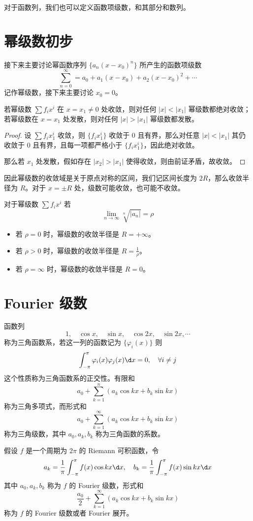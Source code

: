 对于函数列，我们也可以定义函数项级数，和其部分和数列。

\section{幂级数初步}

接下来主要讨论幂函数序列 $\{a_n(x- x_0)^n \}$ 所产生的函数项级数
\[ \sum_{n=0}^{\infty} = a_0 + a_1(x-x_0) + a_2(x-x_0)^2 + \cdots \]
记作幂级数，接下来主要讨论 $x_0 = 0$。

\begin{theorem}
	若幂级数 $\sum f_i x^i$ 在 $x = x_1 \neq 0$ 处收敛，则对任何 $|x| < |x_1|$ 幂级数都绝对收敛；若幂级数在 $x = x_1$ 处发散，则对任何 $|x| > |x_1|$ 幂级数都发散。
\end{theorem}

\begin{proof}
	设 $\sum f_i x_1^i$ 收敛，则 $\{f_i x_1^i\}$ 收敛于 $0$ 且有界，那么对任意 $|x| < |x_1|$ 其仍收敛于 $0$ 且有界，且每一项都严格小于 $\{f_i x_1^i\}$，因此绝对收敛。
	
	那么若 $x_1$ 处发散，假如存在 $|x_2| > |x_1|$ 使得收敛，则由前证矛盾，故收敛。
\end{proof}

因此幂级数的收敛域是关于原点对称的区间，我们记区间长度为 $2R$，那么收敛半径为 $R$。对于 $x = \pm R$ 处，级数可能收敛，也可能不收敛。

\begin{theorem}
	对于幂级数 $\sum f_i x^i$ 若
	\[ \lim_{n \to \infty} \sqrt[n]{|a_n|} = \rho \]
	\begin{itemize}
		\item 若 $\rho = 0$ 时，幂级数的收敛半径是 $R = +\infty$。
		\item 若 $\rho > 0$ 时，幂级数的收敛半径是 $R = \frac{1}{\rho}$。
		\item 若 $\rho = \infty$ 时，幂级数的收敛半径是 $R = 0$。
	\end{itemize}
\end{theorem}

\section{Fourier 级数}

函数列
\[ 1, \quad \cos x, \quad \sin x, \quad \cos 2x, \quad \sin 2x , \cdots \]
称为三角函数系，若这一列的函数记为 $\{\varphi_i(x)\}$ 则
\[ \int_{-\pi}^{\pi} \varphi_i(x) \varphi_j(x) \d x = 0, \quad \forall i \neq j \]
这个性质称为三角函数系的正交性。有限和
\[ a_0 + \sum_{k=1}^n (a_k \cos kx + b_k \sin kx) \]
称为三角多项式，而形式和
\[ a_0 + \sum_{k=1}^\infty (a_k \cos kx + b_k \sin kx) \]
称为三角级数，其中 $a_0, a_k, b_k$ 称为三角函数的系数。

\begin{definition}
	假设 $f$ 是一个周期为 $2\pi$ 的 Riemann 可积函数，令
	\[ a_k = \frac{1}{\pi} \int_{-\pi}^{\pi} f(x) \cos kx \d x, \quad b_k = \frac{1}{\pi} \int_{-\pi}^{\pi} f(x) \sin k x \d x \]
	其中 $a_0, a_k, b_k$ 称为 $f$ 的 Fourier 级数，形式和
	\[ \frac{a_0}{2} + \sum_{k=1}^\infty (a_k \cos k x+ b_k \sin k x) \]
	称为 $f$ 的 Fourier 级数或者 Fourier 展开。
\end{definition}
